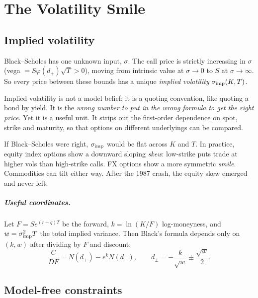 \chapter{The Volatility Smile}\label{ch:smile}

\section{Implied volatility}

Black--Scholes has one unknown input, $\sigma$. The call price is strictly increasing in $\sigma$ (vega $=S\varphi(d_+)\sqrt T>0$), moving from intrinsic value at $\sigma\to0$ to $S$ at $\sigma\to\infty$. So every price between these bounds has a unique \emph{implied volatility} $\sigma_{\rm imp}(K,T)$.

\begin{intuition}
Implied volatility is not a model belief; it is a quoting convention, like quoting a bond by yield. It is the \emph{wrong number to put in the wrong formula to get the right price}. Yet it is a useful unit. It strips out the first-order dependence on spot, strike and maturity, so that options on different underlyings can be compared.
\end{intuition}

If Black--Scholes were right, $\sigma_{\rm imp}$ would be flat across $K$ and $T$. In practice, equity index options show a downward sloping \emph{skew}: low-strike puts trade at higher vols than high-strike calls. FX options show a more symmetric \emph{smile}. Commodities can tilt either way. After the 1987 crash, the equity skew emerged and never left.

\paragraph{Useful coordinates.} Let $F=Se^{(r-q)T}$ be the forward, $k=\ln(K/F)$ log-moneyness, and $w=\sigma_{\rm imp}^2T$ the total implied variance. Then Black's formula depends only on $(k,w)$ after dividing by $F$ and discount:
\[
\frac{C}{DF}=N(d_+)-e^kN(d_-),\qquad d_\pm=-\frac{k}{\sqrt w}\pm\frac{\sqrt w}{2}.
\]

\section{Model-free constraints}

